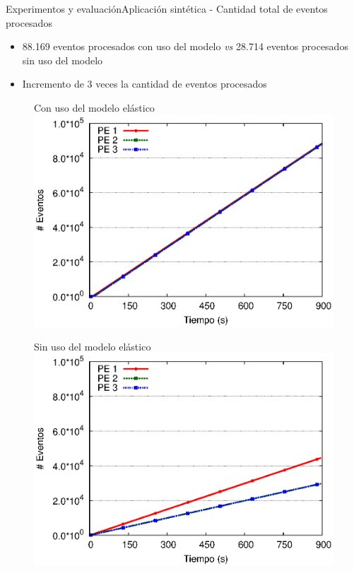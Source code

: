 \begin{frame}{Experimentos y evaluación}{Aplicación sintética - Cantidad total de eventos procesados}

\begin{itemize}
\item 88.169 eventos procesados con uso del modelo \textit{vs} 28.714 eventos procesados sin uso del modelo
\item Incremento de 3 veces la cantidad de eventos procesados
\end{itemize}

\begin{multicols}{2}
\begin{figure}[p]
	\centering
	{\scriptsize Con uso del modelo elástico\\}
	\includegraphics[scale=0.475]{images/exp/app3/cm/logical/eventCount.eps}
\end{figure}

\begin{figure}[p]
	\centering
	{\scriptsize Sin uso del modelo elástico\\}
	\includegraphics[scale=0.475]{images/exp/app3/sm/logical/eventCount.eps}
\end{figure}
\end{multicols}
\end{frame}